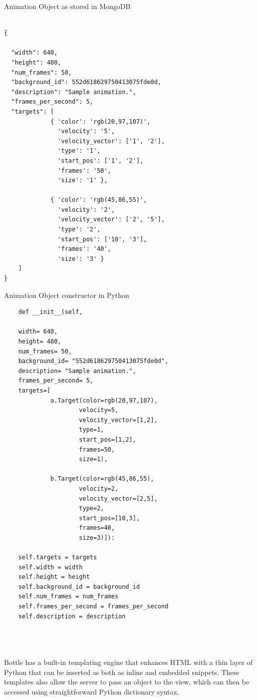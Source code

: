 \documentclass[a4paper,11pt]{article}
\begin{document}
 \begin{minipage}[t]{0.5\textwidth}
  \centering  
  Animation Object as stored in MongoDB
  \begin{verbatim}
  
{

  "width": 640,
  "height": 480,
  "num_frames": 50,
  "background_id": 552d618629750413075fde0d,
  "description": "Sample animation.",
  "frames_per_second": 5,
  "targets": [
             { 'color': 'rgb(20,97,107)',
               'velocity': '5',
               'velocity_vector': ['1', '2'],
               'type': '1',
               'start_pos': ['1', '2'],
               'frames': '50',
               'size': '1' },
                  
             { 'color': 'rgb(45,86,55)',
               'velocity': '2',
               'velocity_vector': ['2', '5'],
               'type': '2',
               'start_pos': ['10', '3'],
               'frames': '40',
               'size': '3' }
    ]
}
  \end{verbatim}
 \end{minipage} 
 \begin{minipage}[t]{0.5\textwidth}
  \centering  
  Animation Object constructor in Python
  \begin{verbatim}	
    def __init__(self,

    width= 640,
    height= 480,    
    num_frames= 50,
    background_id= "552d618629750413075fde0d",
    description= "Sample animation.",
    frames_per_second= 5,
    targets=[
             a.Target(color=rgb(20,97,107),
                     velocity=5,
                     velocity_vector=[1,2],
                     type=1,
                     start_pos=[1,2],
                     frames=50,
                     size=1),
                     
             b.Target(color=rgb(45,86,55),
                     velocity=2,
                     velocity_vector=[2,5],
                     type=2,
                     start_pos=[10,3],
                     frames=40,
                     size=3)]):

    self.targets = targets
    self.width = width
    self.height = height
    self.background_id = background_id
    self.num_frames = num_frames
    self.frames_per_second = frames_per_second
    self.description = description
  \end{verbatim}
 \end{minipage}
\\
\\
\\ 
Bottle has a built-in templating engine that enhances HTML with a thin layer of Python that can be inserted as both as inline and embedded snippets. These templates also allow the server to pass an object to the view, which can then be accessed using straightforward Python dictionary syntax.
\end{document}
